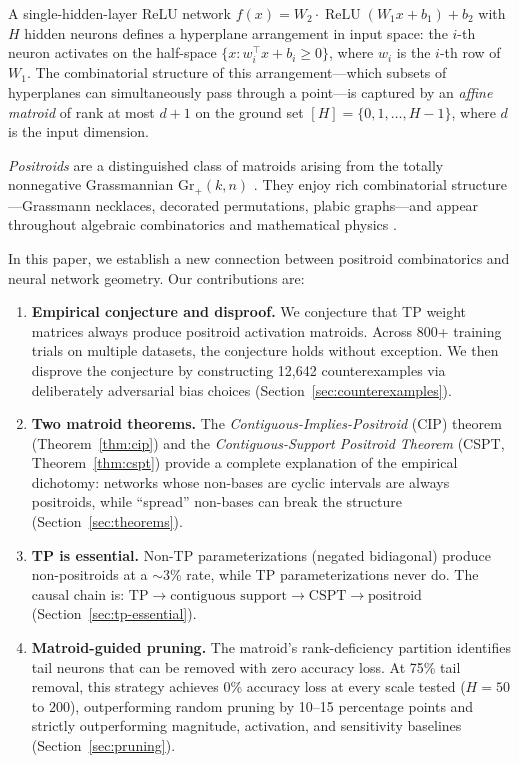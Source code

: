 \documentclass[11pt]{article}
\theoremstyle{definition}
\theoremstyle{remark}
\newcommand{\Gr}{\mathrm{Gr}}
\newcommand{\relu}{\operatorname{ReLU}}
\begin{document}
A single-hidden-layer ReLU network
$f(x) = W_2 \cdot \relu(W_1 x + b_1) + b_2$
with $H$ hidden neurons defines a hyperplane arrangement in input
space: the $i$-th neuron activates on the half-space
$\{x : w_i^\top x + b_i \geq 0\}$, where $w_i$ is the $i$-th row
of $W_1$.  The combinatorial structure of this arrangement---which
subsets of hyperplanes can simultaneously pass through a
point---is captured by an \emph{affine matroid} of rank at most $d+1$ on
the ground set $[H] = \{0, 1, \ldots, H{-}1\}$, where $d$ is the
input dimension.

\emph{Positroids} are a distinguished class of matroids arising from
the totally nonnegative Grassmannian $\Gr_+(k,n)$
\citep{postnikov2006,oh2011,knutson2013}.  They enjoy rich
combinatorial structure---Grassmann necklaces, decorated
permutations, plabic graphs---and appear throughout algebraic
combinatorics and mathematical physics
\citep{lukowski2023}.

In this paper, we establish a new connection between positroid
combinatorics and neural network geometry.  Our contributions are:

\begin{enumerate}
  \item \textbf{Empirical conjecture and disproof.}  We conjecture
    that TP weight matrices always produce positroid activation
    matroids.  Across 800+ training trials on multiple datasets, the
    conjecture holds without exception.  We then disprove the
    conjecture by constructing 12{,}642 counterexamples via
    deliberately adversarial bias choices
    (Section~\ref{sec:counterexamples}).

  \item \textbf{Two matroid theorems.}  The
    \emph{Contiguous-Implies-Positroid} (CIP) theorem
    (Theorem~\ref{thm:cip}) and the \emph{Contiguous-Support
    Positroid Theorem} (CSPT, Theorem~\ref{thm:cspt}) provide a
    complete explanation of the empirical dichotomy: networks whose
    non-bases are cyclic intervals are always positroids, while
    ``spread'' non-bases can break the structure
    (Section~\ref{sec:theorems}).

  \item \textbf{TP is essential.}  Non-TP parameterizations
    (negated bidiagonal) produce non-positroids at a $\sim$3\% rate,
    while TP parameterizations never do.  The causal chain is:
    $\text{TP} \to \text{contiguous support} \to
    \text{CSPT} \to \text{positroid}$
    (Section~\ref{sec:tp-essential}).

  \item \textbf{Matroid-guided pruning.}  The matroid's
    rank-deficiency partition identifies tail neurons that can be
    removed with zero accuracy loss.  At 75\% tail removal, this
    strategy achieves 0\% accuracy loss at every scale tested
    ($H = 50$ to $200$), outperforming random pruning by 10--15
    percentage points and strictly outperforming magnitude,
    activation, and sensitivity baselines
    (Section~\ref{sec:pruning}).
\end{enumerate}
\end{document}

